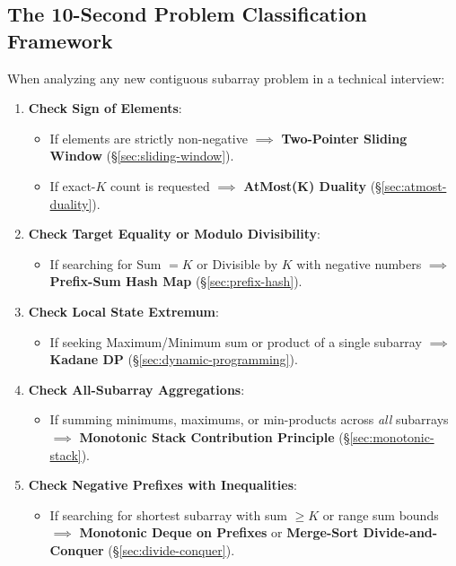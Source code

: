 \documentclass[10pt,journal,compsoc,onecolumn]{IEEEtran}
\begin{document}
\subsection{The 10-Second Problem Classification Framework}

When analyzing any new contiguous subarray problem in a technical interview:
\begin{enumerate}
    \item \textbf{Check Sign of Elements}:
    \begin{itemize}
        \item If elements are strictly non-negative $\implies$ \textbf{Two-Pointer Sliding Window} (\S\ref{sec:sliding-window}).
        \item If exact-$K$ count is requested $\implies$ \textbf{AtMost(K) Duality} (\S\ref{sec:atmost-duality}).
    \end{itemize}
    \item \textbf{Check Target Equality or Modulo Divisibility}:
    \begin{itemize}
        \item If searching for Sum $= K$ or Divisible by $K$ with negative numbers $\implies$ \textbf{Prefix-Sum Hash Map} (\S\ref{sec:prefix-hash}).
    \end{itemize}
    \item \textbf{Check Local State Extremum}:
    \begin{itemize}
        \item If seeking Maximum/Minimum sum or product of a single subarray $\implies$ \textbf{Kadane DP} (\S\ref{sec:dynamic-programming}).
    \end{itemize}
    \item \textbf{Check All-Subarray Aggregations}:
    \begin{itemize}
        \item If summing minimums, maximums, or min-products across \emph{all} subarrays $\implies$ \textbf{Monotonic Stack Contribution Principle} (\S\ref{sec:monotonic-stack}).
    \end{itemize}
    \item \textbf{Check Negative Prefixes with Inequalities}:
    \begin{itemize}
        \item If searching for shortest subarray with sum $\ge K$ or range sum bounds $\implies$ \textbf{Monotonic Deque on Prefixes} or \textbf{Merge-Sort Divide-and-Conquer} (\S\ref{sec:divide-conquer}).
    \end{itemize}

\end{enumerate}
\end{document}

